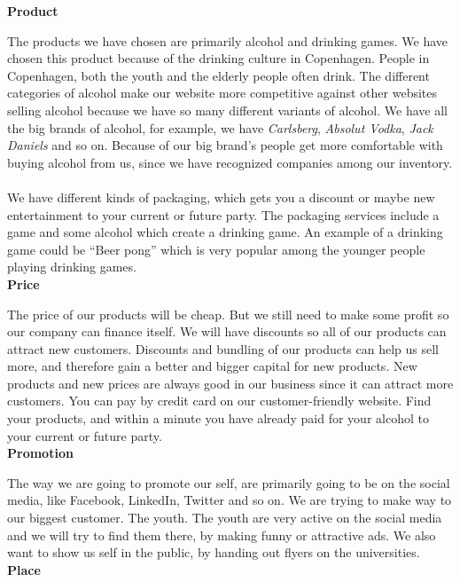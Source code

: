 \documentclass[12p]{article}
\begin{document}
\label{PPPP}

\textbf{Product}

The products we have chosen are primarily alcohol and drinking games. We have chosen this product because of the drinking culture in Copenhagen. People in Copenhagen, both the youth and the elderly people often drink. The different categories of alcohol make our website more competitive against other websites selling alcohol because we have so many different variants of alcohol. We have all the big brands of alcohol, for example, we have \emph{Carlsberg}, \emph{Absolut Vodka}, \emph{Jack Daniels} and so on. Because of our big brand's people get more comfortable with buying alcohol from us, since we have recognized companies among our inventory. 
\\ \\
We have different kinds of packaging, which gets you a discount or maybe new entertainment to your current or future party. The packaging services include a game and some alcohol which create a drinking game. An example of a drinking game could be “Beer pong” which is very popular among the younger people playing drinking games. \\


\textbf{Price}

The price of our products will be cheap. But we still need to make some profit so our company can finance itself. We will have discounts so all of our products can attract new customers. Discounts and bundling of our products can help us sell more, and therefore gain a better and bigger capital for new products. New products and new prices are always good in our business since it can attract more customers. You can pay by credit card on our customer-friendly website. Find your products, and within a minute you have already paid for your alcohol to your current or future party.  \\

\textbf{Promotion}

The way we are going to promote our self, are primarily going to be on the social media, like Facebook, LinkedIn, Twitter and so on. We are trying to make way to our biggest customer. The youth. The youth are very active on the social media and we will try to find them there, by making funny or attractive ads. We also want to show us self in the public, by handing out flyers on the universities. \\


\textbf{Place}
\end{document}
